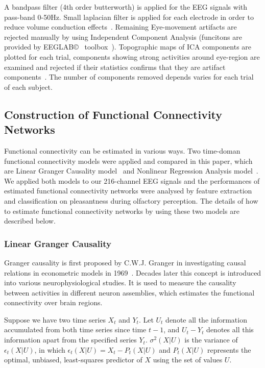 A bandpass filter (4th order butterworth) is applied for the EEG signals with pass-band 0-50Hz. Small laplacian filter is applied for each electrode in order to reduce volume conduction effects~\cite{wolters2007volume}. Remaining Eye-movement artifacts are rejected manually by using Independent Component Analysis (funcitons are provided by EEGLAB\copyright~ toolbox~\cite{luck2014introduction}). Topographic maps of ICA components are plotted for each trial, components showing strong activities around eye-region are examined and rejected if their statistics confirms that they are artifact components~\cite{luck2014introduction}. The number of components removed depends varies for each trial of each subject. 

\subsection{Construction of Functional Connectivity Networks}
Functional connectivity can be estimated in various ways. Two time-doman functional connectivity models were applied and compared in this paper, which are Linear Granger Causality model~\cite{roebroeck2005mapping}  and Nonlinear Regression Analysis model~\cite{bettus2008enhanced}. We applied both models to our 216-channel EEG signals and the performances of estimated functional connectivity networks were analysed by feature extraction and classification on pleasantness during olfactory perception. The details of how to estimate functional connectivity networks by using these two models are described below.

\subsubsection{Linear Granger Causality}
Granger causality is first proposed by C.W.J. Granger in investigating causal relations in econometric models in 1969~\cite{granger1969investigating}. Decades later this concept is introduced into various neurophysiological studies. It is used to measure the causality between activities in different neuron assemblies, which estimates the functional connectivity over brain regions. 

Suppose we have two time series $X_t$ and $Y_t$. Let $U_t$ denote all the information accumulated from both time series since time $t-1$, and $U_t-Y_t$ denotes all this information apart from the specified series $Y_t$. $\sigma^2(X|U)$ is the variance of $\epsilon_t(X|U)$, in which $\epsilon_t(X|U)=X_t-P_t(X|U)$ and $P_t(X|U)$ represents the optimal, unbiased, least-squares predictor of $X$ using the set of values $U$.


